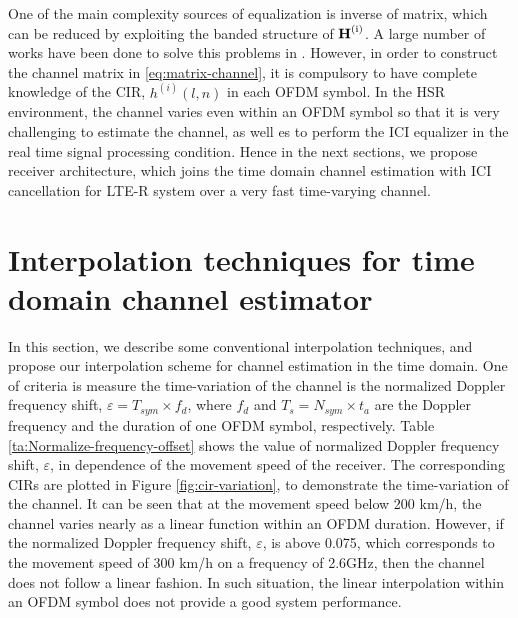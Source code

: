 \documentclass[AMA]{WileyNJD-v1}
\begin{document}
One of the main complexity sources of equalization is inverse of matrix, which can be reduced by exploiting  the banded structure of $\rm{\textbf H^{(i)}}$. A large number of works have been done to solve this problems in \cite{Hsu2009, Liu2012, Schniter2004, Fang2007}. However, in order to construct the channel matrix in \eqref{eq:matrix-channel}, it is compulsory to have complete knowledge of the CIR, $h^{(i)}(l,n)$ in each OFDM symbol. In the HSR environment, the channel varies even within an OFDM symbol so that it is very challenging to estimate the channel, as well es to perform the ICI equalizer in the real time signal processing condition. Hence in the next sections, we propose receiver architecture, which joins the  time domain channel estimation with ICI cancellation for LTE-R system over a very fast time-varying channel.
	
\section{Interpolation techniques for time domain channel estimator}\label{section-3}
	
In this section, we describe some conventional interpolation techniques, and propose our interpolation scheme for channel estimation in the time domain. One of criteria is measure the time-variation of the channel is the normalized Doppler frequency shift, $\varepsilon = T_{sym}\times f_{d}$, where $f_{d}$ and $T_{s}=N_{sym}\times t_{a}$ are the Doppler frequency and the duration of one OFDM symbol, respectively. Table \ref{ta:Normalize-frequency-offset} shows the value of normalized Doppler frequency shift, $\varepsilon$, in dependence of the movement speed of the receiver. The corresponding CIRs are plotted in Figure \ref{fig:cir-variation}, to demonstrate the time-variation of the channel. It can be seen that at the movement speed below 200 km/h, the channel varies nearly as a linear function  within an OFDM duration. However,  if the normalized Doppler frequency shift, $\varepsilon$, is above 0.075, which corresponds to the movement speed of 300 km/h on a frequency of 2.6GHz, then the channel does not follow a linear fashion. In such situation, the linear interpolation within an OFDM symbol does not provide a good system performance.
	
\end{document}
